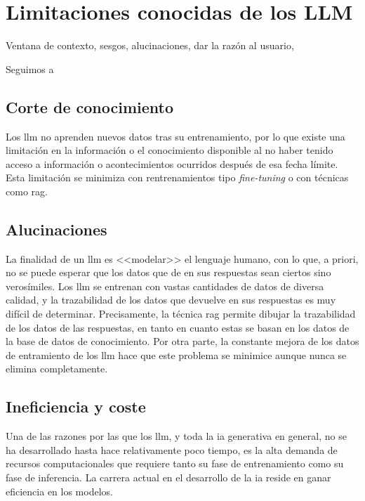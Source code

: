\section{Limitaciones conocidas de los LLM}
\label{sec:limitaciones_llm}
Ventana de contexto, sesgos, alucinaciones, dar la razón al usuario, 

Seguimos a \cite{arunbijiRAGVsFinetuning}



\subsection{Corte de conocimiento}

Los \gls{llm} no aprenden nuevos datos tras su entrenamiento, por lo que existe una limitación en la información o el conocimiento disponible al no haber tenido acceso a información o acontecimientos ocurridos después de esa fecha límite. Esta limitación se minimiza con rentrenamientos tipo \emph{fine-tuning} o con técnicas como \gls{rag}.

\subsection{Alucinaciones}

La finalidad de un \gls{llm} es <<modelar>> el lenguaje humano, con lo que, a priori, no se puede esperar que los datos que de en sus respuestas sean ciertos sino verosímiles. Los \gls{llm} se entrenan con vastas cantidades de datos de diversa calidad, y la trazabilidad de los datos que devuelve en sus respuestas es muy difícil de determinar. Precisamente, la técnica \gls{rag} permite dibujar la trazabilidad de los datos de las respuestas, en tanto en cuanto estas se basan en los datos de la base de datos de conocimiento. Por otra parte, la constante mejora de los datos de entramiento de los \gls{llm} \citep{gunasekarTextbooksAreAll2023} hace que este problema se minimice aunque nunca se elimina completamente.

\subsection{Ineficiencia y coste}

Una de las razones por las que los \gls{llm}, y toda la \gls{ia} generativa en general, no se ha desarrollado hasta hace relativamente poco tiempo, es la alta demanda de recursos computacionales que requiere tanto su fase de entrenamiento como su fase de inferencia. La carrera actual en el desarrollo de la \gls{ia} reside en ganar eficiencia en los modelos. 

